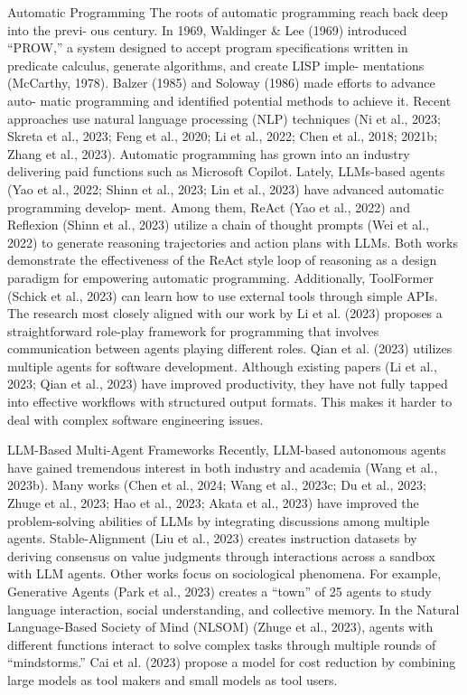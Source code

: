 \documentclass[12pt]{article}
\begin{document}
Automatic Programming The roots of automatic programming reach back deep into the previ-
ous century. In 1969, Waldinger \& Lee (1969) introduced “PROW,” a system designed to accept
program specifications written in predicate calculus, generate algorithms, and create LISP imple-
mentations (McCarthy, 1978). Balzer (1985) and Soloway (1986) made efforts to advance auto-
matic programming and identified potential methods to achieve it. Recent approaches use natural
language processing (NLP) techniques (Ni et al., 2023; Skreta et al., 2023; Feng et al., 2020; Li
et al., 2022; Chen et al., 2018; 2021b; Zhang et al., 2023). Automatic programming has grown into
an industry delivering paid functions such as Microsoft Copilot. Lately, LLMs-based agents (Yao
et al., 2022; Shinn et al., 2023; Lin et al., 2023) have advanced automatic programming develop-
ment. Among them, ReAct (Yao et al., 2022) and Reflexion (Shinn et al., 2023) utilize a chain of
thought prompts (Wei et al., 2022) to generate reasoning trajectories and action plans with LLMs.
Both works demonstrate the effectiveness of the ReAct style loop of reasoning as a design paradigm
for empowering automatic programming. Additionally, ToolFormer (Schick et al., 2023) can learn
how to use external tools through simple APIs. The research most closely aligned with our work
by Li et al. (2023) proposes a straightforward role-play framework for programming that involves
communication between agents playing different roles. Qian et al. (2023) utilizes multiple agents for
software development. Although existing papers (Li et al., 2023; Qian et al., 2023) have improved
productivity, they have not fully tapped into effective workflows with structured output formats.
This makes it harder to deal with complex software engineering issues.


LLM-Based Multi-Agent Frameworks Recently, LLM-based autonomous agents have gained
tremendous interest in both industry and academia (Wang et al., 2023b). Many works (Chen et al.,
2024; Wang et al., 2023c; Du et al., 2023; Zhuge et al., 2023; Hao et al., 2023; Akata et al., 2023)
have improved the problem-solving abilities of LLMs by integrating discussions among multiple
agents. Stable-Alignment (Liu et al., 2023) creates instruction datasets by deriving consensus on
value judgments through interactions across a sandbox with LLM agents. Other works focus on
sociological phenomena. For example, Generative Agents (Park et al., 2023) creates a “town” of 25
agents to study language interaction, social understanding, and collective memory. In the Natural
Language-Based Society of Mind (NLSOM) (Zhuge et al., 2023), agents with different functions
interact to solve complex tasks through multiple rounds of “mindstorms.” Cai et al. (2023) propose
a model for cost reduction by combining large models as tool makers and small models as tool users.
\end{document}

